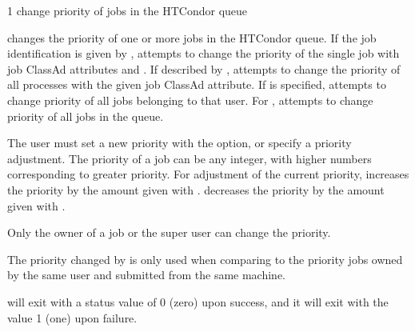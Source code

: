 \begin{ManPage}{\label{man-condor-prio}}{1}
{change priority of jobs in the HTCondor queue} 

\Synopsis {}
 \Bar{}  \Bar{} 

 \Bar{}  \Bar{} 
\Lbr {}   \Rbr
{}

\Description

 changes the priority of one or more jobs in the HTCondor queue.
If the job identification is given by ,
 attempts to change the priority of the single job
with job ClassAd attributes  and .
If described by ,
 attempts to change the priority of all processes with the
given  job ClassAd attribute.
If  is specified,  attempts to change priority
of all jobs belonging to that user.
For ,  attempts to change priority of
all jobs in the queue.

The user must set a new priority with the  option,
or specify a priority adjustment. 
The priority of a job can be any integer, with higher numbers
corresponding to greater priority.
For adjustment of the current priority,
 increases the priority by the amount given with .
 decreases the priority by the amount given with .

Only the owner of a job or the super user can change the priority.

The priority changed by  is only used when
comparing to the priority
jobs owned by the same user and submitted from the same machine.

\begin{Options}
\end{Options}

\ExitStatus

 will exit with a status value of 0 (zero) upon success,
and it will exit with the value 1 (one) upon failure.

\end{ManPage}

